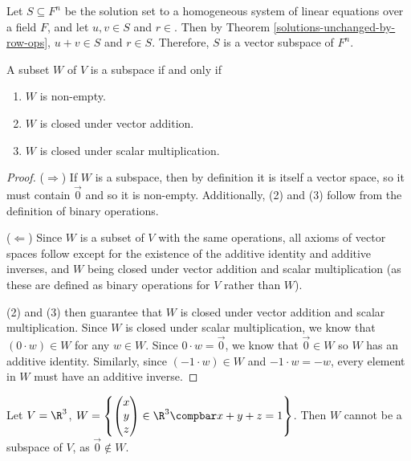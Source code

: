 \documentclass[12pt]{article}
\begin{document}
\begin{exmp}
    Let $S \subseteq F^n$ be the solution set to a homogeneous system of linear equations over a field $F$, and let $u, v \in S$ and $r \in$. Then by Theorem \ref{solutions-unchanged-by-row-ops}, $u + v \in S$ and $r \in S$. Therefore, $S$ is a vector subspace of $F^n$.
\end{exmp}

\begin{prop}\label{subspace-proof}
    A subset $W$ of $V$ is a subspace if and only if
    \begin{enumerate}
        \item $W$ is non-empty.
        \item $W$ is closed under vector addition.
        \item $W$ is closed under scalar multiplication.
    \end{enumerate}
\end{prop}

\begin{proof}\proofbreak
    ($\Longrightarrow$) If $W$ is a subspace, then by definition it is itself a vector space, so it must contain $\vec{0}$ and so it is non-empty. Additionally, (2) and (3) follow from the definition of binary operations.

    ($\Longleftarrow$) Since $W$ is a subset of $V$ with the same operations, all axioms of vector spaces follow except for the existence of the additive identity and additive inverses, and $W$ being closed under vector addition and scalar multiplication (as these are defined as binary operations for $V$ rather than $W$).

    (2) and (3) then guarantee that $W$ is closed under vector addition and scalar multiplication. Since $W$ is closed under scalar multiplication, we know that $(0 \cdot w) \in W$ for any $w \in W$. Since $0 \cdot w = \vec{0}$, we know that $\vec{0} \in W$ so $W$ has an additive identity. Similarly, since $(-1 \cdot w) \in W$ and $-1 \cdot w = -w$, every element in $W$ must have an additive inverse.
\end{proof}

\begin{exmp}
    Let $V = \R^3$, $W = \left\{\begin{pmatrix}
            x \\ y \\ z
        \end{pmatrix} \in \R^3 \compbar x + y + z = 1\right\}$. Then $W$ cannot be a subspace of $V$, as $\vec{0} \notin W$.
\end{exmp}
\end{document}
